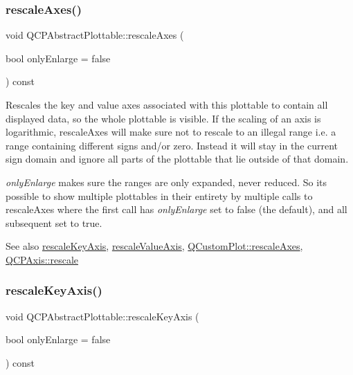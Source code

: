 \subsubsection{\texorpdfstring{rescale\+Axes()}{rescaleAxes()}}
{\footnotesize\ttfamily void Q\+C\+P\+Abstract\+Plottable\+::rescale\+Axes (\begin{DoxyParamCaption}\item[{bool}]{only\+Enlarge = {\ttfamily false} }\end{DoxyParamCaption}) const}

Rescales the key and value axes associated with this plottable to contain all displayed data, so the whole plottable is visible. If the scaling of an axis is logarithmic, rescale\+Axes will make sure not to rescale to an illegal range i.\+e. a range containing different signs and/or zero. Instead it will stay in the current sign domain and ignore all parts of the plottable that lie outside of that domain.

{\itshape only\+Enlarge} makes sure the ranges are only expanded, never reduced. So it\textquotesingle{}s possible to show multiple plottables in their entirety by multiple calls to rescale\+Axes where the first call has {\itshape only\+Enlarge} set to false (the default), and all subsequent set to true.

\begin{DoxySeeAlso}{See also}
\mbox{\hyperlink{class_q_c_p_abstract_plottable_ae96b83c961e257da116c6acf9c7da308}{rescale\+Key\+Axis}}, \mbox{\hyperlink{class_q_c_p_abstract_plottable_aa1e408bb2d13999150c3f7f8a8579ca9}{rescale\+Value\+Axis}}, \mbox{\hyperlink{class_q_custom_plot_ad86528f2cee6c7e446dea4a6e8839935}{Q\+Custom\+Plot\+::rescale\+Axes}}, \mbox{\hyperlink{class_q_c_p_axis_a499345f02ebce4b23d8ccec96e58daa9}{Q\+C\+P\+Axis\+::rescale}} 
\end{DoxySeeAlso}
\mbox{\label{class_q_c_p_abstract_plottable_ae96b83c961e257da116c6acf9c7da308}} 
\subsubsection{\texorpdfstring{rescale\+Key\+Axis()}{rescaleKeyAxis()}}
{\footnotesize\ttfamily void Q\+C\+P\+Abstract\+Plottable\+::rescale\+Key\+Axis (\begin{DoxyParamCaption}\item[{bool}]{only\+Enlarge = {\ttfamily false} }\end{DoxyParamCaption}) const}

